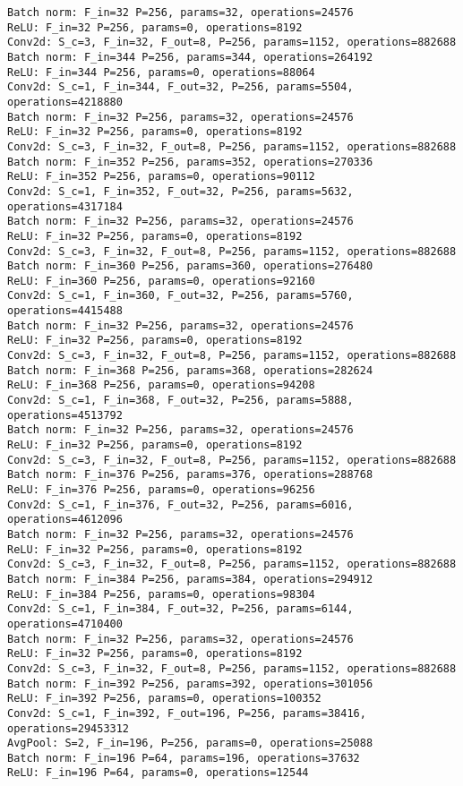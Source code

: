 \begin{Verbatim}[fontsize=\small]
Batch norm: F_in=32 P=256, params=32, operations=24576
ReLU: F_in=32 P=256, params=0, operations=8192
Conv2d: S_c=3, F_in=32, F_out=8, P=256, params=1152, operations=882688
Batch norm: F_in=344 P=256, params=344, operations=264192
ReLU: F_in=344 P=256, params=0, operations=88064
Conv2d: S_c=1, F_in=344, F_out=32, P=256, params=5504, operations=4218880
Batch norm: F_in=32 P=256, params=32, operations=24576
ReLU: F_in=32 P=256, params=0, operations=8192
Conv2d: S_c=3, F_in=32, F_out=8, P=256, params=1152, operations=882688
Batch norm: F_in=352 P=256, params=352, operations=270336
ReLU: F_in=352 P=256, params=0, operations=90112
Conv2d: S_c=1, F_in=352, F_out=32, P=256, params=5632, operations=4317184
Batch norm: F_in=32 P=256, params=32, operations=24576
ReLU: F_in=32 P=256, params=0, operations=8192
Conv2d: S_c=3, F_in=32, F_out=8, P=256, params=1152, operations=882688
Batch norm: F_in=360 P=256, params=360, operations=276480
ReLU: F_in=360 P=256, params=0, operations=92160
Conv2d: S_c=1, F_in=360, F_out=32, P=256, params=5760, operations=4415488
Batch norm: F_in=32 P=256, params=32, operations=24576
ReLU: F_in=32 P=256, params=0, operations=8192
Conv2d: S_c=3, F_in=32, F_out=8, P=256, params=1152, operations=882688
Batch norm: F_in=368 P=256, params=368, operations=282624
ReLU: F_in=368 P=256, params=0, operations=94208
Conv2d: S_c=1, F_in=368, F_out=32, P=256, params=5888, operations=4513792
Batch norm: F_in=32 P=256, params=32, operations=24576
ReLU: F_in=32 P=256, params=0, operations=8192
Conv2d: S_c=3, F_in=32, F_out=8, P=256, params=1152, operations=882688
Batch norm: F_in=376 P=256, params=376, operations=288768
ReLU: F_in=376 P=256, params=0, operations=96256
Conv2d: S_c=1, F_in=376, F_out=32, P=256, params=6016, operations=4612096
Batch norm: F_in=32 P=256, params=32, operations=24576
ReLU: F_in=32 P=256, params=0, operations=8192
Conv2d: S_c=3, F_in=32, F_out=8, P=256, params=1152, operations=882688
Batch norm: F_in=384 P=256, params=384, operations=294912
ReLU: F_in=384 P=256, params=0, operations=98304
Conv2d: S_c=1, F_in=384, F_out=32, P=256, params=6144, operations=4710400
Batch norm: F_in=32 P=256, params=32, operations=24576
ReLU: F_in=32 P=256, params=0, operations=8192
Conv2d: S_c=3, F_in=32, F_out=8, P=256, params=1152, operations=882688
Batch norm: F_in=392 P=256, params=392, operations=301056
ReLU: F_in=392 P=256, params=0, operations=100352
Conv2d: S_c=1, F_in=392, F_out=196, P=256, params=38416, operations=29453312
AvgPool: S=2, F_in=196, P=256, params=0, operations=25088
Batch norm: F_in=196 P=64, params=196, operations=37632
ReLU: F_in=196 P=64, params=0, operations=12544

\end{Verbatim}
